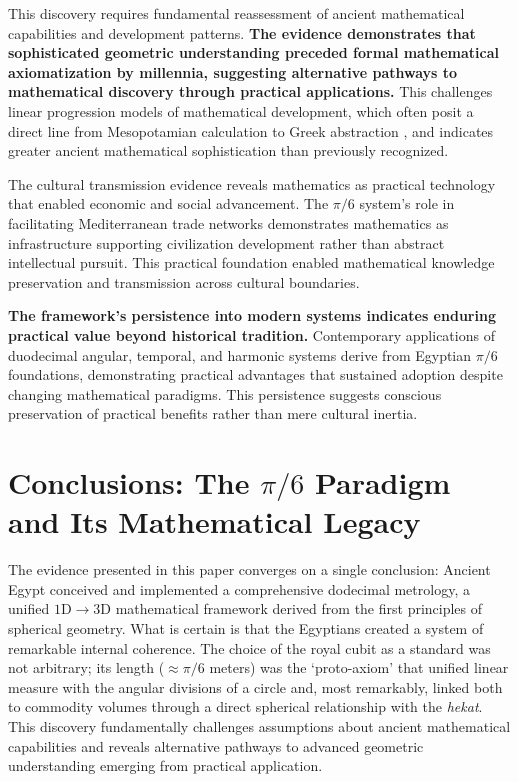 \documentclass[11pt]{article}
\begin{document}
This discovery requires fundamental reassessment of ancient mathematical capabilities and development patterns. \textbf{The evidence demonstrates that sophisticated geometric understanding preceded formal mathematical axiomatization by millennia, suggesting alternative pathways to mathematical discovery through practical applications.} This challenges linear progression models of mathematical development, which often posit a direct line from Mesopotamian calculation to Greek abstraction \cite{neugebauer1969exact}, and indicates greater ancient mathematical sophistication than previously recognized.

The cultural transmission evidence reveals mathematics as practical technology that enabled economic and social advancement. The $\pi/6$ system's role in facilitating Mediterranean trade networks demonstrates mathematics as infrastructure supporting civilization development rather than abstract intellectual pursuit. This practical foundation enabled mathematical knowledge preservation and transmission across cultural boundaries.

\textbf{The framework's persistence into modern systems indicates enduring practical value beyond historical tradition.} Contemporary applications of duodecimal angular, temporal, and harmonic systems derive from Egyptian $\pi/6$ foundations, demonstrating practical advantages that sustained adoption despite changing mathematical paradigms. This persistence suggests conscious preservation of practical benefits rather than mere cultural inertia.

\section{Conclusions: The \texorpdfstring{$\pi/6$}{pi/6} Paradigm and Its Mathematical Legacy}

The evidence presented in this paper converges on a single conclusion: Ancient Egypt conceived and implemented a comprehensive dodecimal metrology, a unified $1\text{D} \to 3\text{D}$ mathematical framework derived from the first principles of spherical geometry. What is certain is that the Egyptians created a system of remarkable internal coherence. The choice of the royal cubit as a standard was not arbitrary; its length ($\approx\pi/6$ meters) was the `proto-axiom' that unified linear measure with the angular divisions of a circle and, most remarkably, linked both to commodity volumes through a direct spherical relationship with the \textit{hekat}. This discovery fundamentally challenges assumptions about ancient mathematical capabilities and reveals alternative pathways to advanced geometric understanding emerging from practical application.
\end{document}
